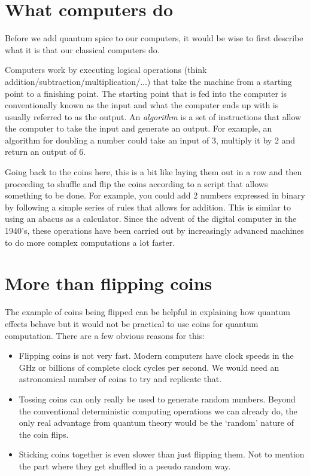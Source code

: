 \documentclass{book}
\begin{document}
\section{What computers do}

Before we add quantum spice to our computers, it would be wise to first describe what it is that our classical computers do. 

Computers work by executing logical operations (think addition/subtraction/multiplication/...) that take the machine from a starting point to a finishing point. The starting point that is fed into the computer is conventionally known as the input and what the computer ends up with is usually referred to as the output. An \textit{algorithm} is a set of instructions that allow the computer to take the input and generate an output. For example, an algorithm for doubling a number could take an input of 3, multiply it by 2 and return an output of 6. 

Going back to the coins here, this is a bit like laying them out in a row and then proceeding to shuffle and flip the coins according to a script that allows something to be done. For example, you could add 2 numbers expressed in binary by following a simple series of rules that allows for addition. This is similar to using an abacus as a calculator. Since the advent of the digital computer in the 1940's, these operations have been carried out by increasingly advanced machines to do more complex computations a lot faster.

\section{More than flipping coins} 

The example of coins being flipped can be helpful in explaining how quantum effects behave but it would not be practical to use coins for quantum computation. There are a few obvious reasons for this: 

\begin{itemize}
    \item Flipping coins is not very fast. Modern computers have clock speeds in the GHz or billions of complete clock cycles per second. We would need an astronomical number of coins to try and replicate that. 
    
    \item Tossing coins can only really be used to generate random numbers. Beyond the conventional deterministic computing operations we can already do, the only real advantage from quantum theory would be the `random' nature of the coin flips. 
    
    \item Sticking coins together is even slower than just flipping them. Not to mention the part where they get shuffled in a pseudo random way. 
\end{itemize}
\end{document}
